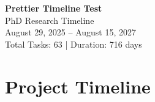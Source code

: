 \documentclass[portrait,a4paper]{article}
\begin{document}
\begin{center}
\vspace*{2cm}
{\Huge\bfseries Prettier Timeline Test}\\
\vspace{1cm}
{\Large PhD Research Timeline}\\
\vspace{0.5cm}
{\large August 29, 2025 -- August 15, 2027}\\
\vspace{1cm}
{\large Total Tasks: 63 | Duration: 716 days}
\end{center}

\vspace{2cm}

\section*{Project Timeline}
\vspace{0.5cm}

\end{document}
